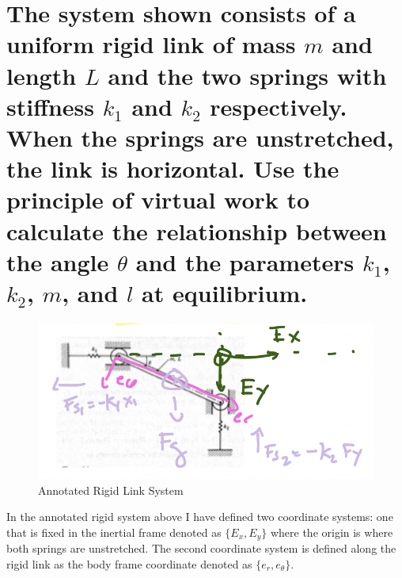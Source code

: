 \documentclass{article}
\begin{document}
\section{The system shown consists of a uniform rigid link of mass $m$ and length $L$ and the two springs with stiffness $k_1$ and $k_2$ respectively. When the springs are unstretched, the link is horizontal. Use the principle of virtual work to calculate the relationship between the angle $\theta$ and the parameters $k_1$, $k_2$, $m$, and $l$ at equilibrium.}

\begin{figure}[H]
    \centering
    \includegraphics[width=0.6\linewidth]{problem4.png}
    \caption{Annotated Rigid Link System}
\end{figure}
In the annotated rigid system above I have defined two coordinate systems: one that is fixed in the inertial frame denoted as $\{E_x, E_y\}$ where the origin is where both springs are unstretched. The second coordinate system is defined along the rigid link as the body frame coordinate denoted as $\{e_r, e_{\theta}\}$.
\end{document}
